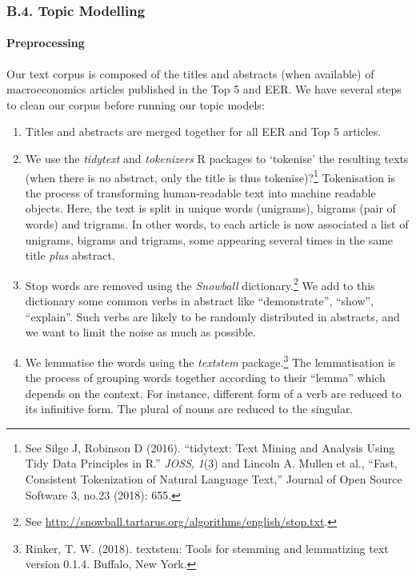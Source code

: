 \documentclass[
  12pt,
  onecolumn]{article}
\providecommand{\tightlist}{%
  \setlength{\itemsep}{0pt}\setlength{\parskip}{0pt}}
\begin{document}
\hypertarget{topic}{%
\subsubsection*{B.4. Topic Modelling}\label{topic}}

\hypertarget{preprocessing}{%
\paragraph*{Preprocessing}\label{preprocessing}}

Our text corpus is composed of the titles and abstracts (when available)
of macroeconomics articles published in the Top 5 and EER. We have
several steps to clean our corpus before running our topic models:

\begin{enumerate}
\def\labelenumi{\arabic{enumi}.}
\tightlist
\item
  Titles and abstracts are merged together for all EER and Top 5
  articles.
\item
  We use the \emph{tidytext} and \emph{tokenizers} R packages to
  `tokenise' the resulting texts (when there is no abstract, only the
  title is thus tokenise)?\footnote{See Silge J, Robinson D (2016).
    ``tidytext: Text Mining and Analysis Using Tidy Data Principles in
    R.'' \emph{JOSS}, \emph{1}(3) and Lincoln A. Mullen et al., ``Fast,
    Consistent Tokenization of Natural Language Text,'' Journal of Open
    Source Software 3, no.23 (2018): 655.} Tokenisation is the process
  of transforming human-readable text into machine readable objects.
  Here, the text is split in unique words (unigrams), bigrams (pair of
  words) and trigrams. In other words, to each article is now associated
  a list of unigrams, bigrams and trigrams, some appearing several times
  in the same title \emph{plus} abstract.
\item
  Stop words are removed using the \emph{Snowball}
  dictionary.\footnote{See
    \url{http://snowball.tartarus.org/algorithms/english/stop.txt}.} We
  add to this dictionary some common verbs in abstract like
  ``demonstrate'', ``show'', ``explain''. Such verbs are likely to be
  randomly distributed in abstracts, and we want to limit the noise as
  much as possible.
\item
  We lemmatise the words using the \emph{textstem} package.\footnote{Rinker,
    T. W. (2018). textstem: Tools for stemming and lemmatizing text
    version 0.1.4. Buffalo, New York.} The lemmatisation is the process
  of grouping words together according to their ``lemma'' which depends
  on the context. For instance, different form of a verb are reduced to
  its infinitive form. The plural of nouns are reduced to the singular.
\end{enumerate}
\end{document}
